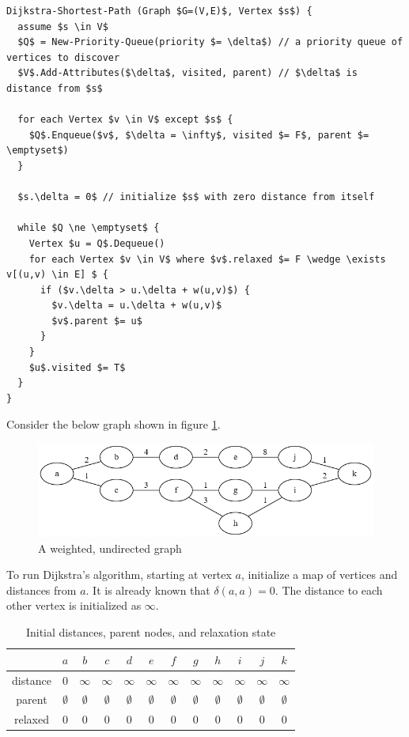 \documentclass{book}
\begin{document}
\begin{lstlisting}[caption={Dijkstra's algorithm in pseudocode}, captionpos=b, mathescape, xleftmargin=.25in, xrightmargin=.25in]
Dijkstra-Shortest-Path (Graph $G=(V,E)$, Vertex $s$) {
  assume $s \in V$
  $Q$ = New-Priority-Queue(priority $= \delta$) // a priority queue of vertices to discover
  $V$.Add-Attributes($\delta$, visited, parent) // $\delta$ is distance from $s$
  
  for each Vertex $v \in V$ except $s$ {
    $Q$.Enqueue($v$, $\delta = \infty$, visited $= F$, parent $= \emptyset$)
  }
  
  $s.\delta = 0$ // initialize $s$ with zero distance from itself
  
  while $Q \ne \emptyset$ {
    Vertex $u = Q$.Dequeue()
    for each Vertex $v \in V$ where $v$.relaxed $= F \wedge \exists v[(u,v) \in E] $ {
      if ($v.\delta > u.\delta + w(u,v)$) {
        $v.\delta = u.\delta + w(u,v)$
        $v$.parent $= u$
      }
    }
    $u$.visited $= T$
  }
}
\end{lstlisting}

Consider the below graph shown in figure \ref{spf0}. 

\begin{figure}[H]
\centering
\includegraphics[width=\textwidth]{ch-dijkstra/spf0}
\caption{A weighted, undirected graph}
\label{spf0}
\end{figure}

To run Dijkstra's algorithm, starting at vertex $a$, initialize a map of vertices and distances from $a$. It is already known that $\delta(a,a)=0$. The distance to each other vertex is initialized as $\infty$.

\begin{table}[H]
\centering
\begin{tabular}{ | c | c | c | c | c | c | c | c | c | c | c | c | }
\hline
 & $a$ & $b$ & $c$ & $d$ & $e$ & $f$ & $g$ & $h$ & $i$ & $j$ & $k$ \\
 \hline
 distance & 0 & $\infty$ & $\infty$ & $\infty$ & $\infty$ & $\infty$ & $\infty$ & $\infty$ & $\infty$ & $\infty$ & $\infty$ \\
 \hline
 parent & $\emptyset$ & $\emptyset$ & $\emptyset$ & $\emptyset$ & $\emptyset$ & $\emptyset$ & $\emptyset$ & $\emptyset$ & $\emptyset$ & $\emptyset$ & $\emptyset$ \\
 \hline
 relaxed & 0 & 0 & 0 & 0 & 0 & 0 & 0 & 0 & 0 & 0 & 0 \\
 \hline
\end{tabular}
\caption{Initial distances, parent nodes, and relaxation state}
\label{initial}
\end{table}
\end{document}

